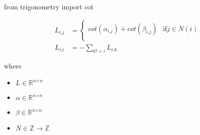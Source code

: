 \documentclass[12pt]{article}
\begin{document}
from trigonometry import cot

\begin{align*}
\textit{L}_{\textit{i}, \textit{j}} & = \begin{cases} cot\left( \textit{α}_{\textit{i}, \textit{j}} \right) + cot\left( \textit{β}_{\textit{i}, \textit{j}} \right) & \text{if}  \textit{j} \in \textit{N}\left( \textit{i} \right)  \\ \end{cases}  \\
\textit{L}_{\textit{i}, \textit{i}} & = -\sum_{\textit{k} != \textit{i}} \textit{L}_{\textit{i}, \textit{k}}
\end{align*}

where
\begin{itemize}
\item $\textit{L} \in \mathbb{R}^{ \textit{n} \times \textit{n} }$
\item $\textit{α} \in \mathbb{R}^{ \textit{n} \times \textit{n} }$
\item $\textit{β} \in \mathbb{R}^{ \textit{n} \times \textit{n} }$
\item $\textit{N} \in \mathbb{{Z}}\rightarrow \mathbb{Z}$
\end{itemize}
\end{document}
